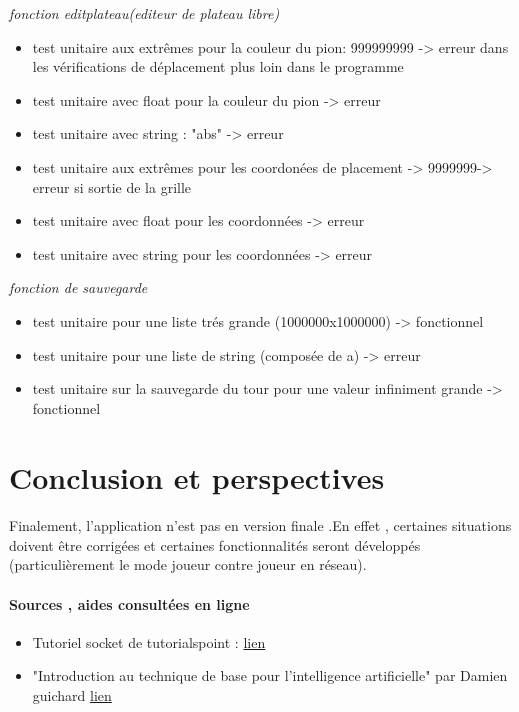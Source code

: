 \documentclass[a4paper,12pt]{article}
\begin{document}
\emph{fonction editplateau(editeur de plateau libre)}
\begin{itemize}
\item test unitaire aux extrêmes pour la couleur du pion: 999999999 -> erreur dans les vérifications de déplacement plus loin dans le programme
\item test unitaire avec float pour la couleur du pion -> erreur
\item test unitaire avec string  : "abs"  -> erreur
\item test unitaire aux extrêmes pour les coordonées de placement -> 9999999-> erreur si sortie de la grille
\item test unitaire avec float pour les coordonnées -> erreur
\item test unitaire avec string pour les coordonnées -> erreur
\newline
\end{itemize}


\emph{fonction de sauvegarde}
\begin{itemize}
\item test unitaire pour une liste trés grande (1000000x1000000) -> fonctionnel
\item test unitaire pour une liste de string (composée de a) -> erreur
\item test unitaire sur la sauvegarde du tour pour une valeur infiniment grande -> fonctionnel
\end{itemize}

\newpage

\section{Conclusion et perspectives}
\paragraph{}
Finalement, l'application n'est pas en version finale .En effet , certaines situations doivent être corrigées et certaines fonctionnalités seront développés (particulièrement le mode joueur contre joueur en réseau).
\newline
\paragraph{Sources , aides consultées en ligne}
\begin{itemize}
\item Tutoriel socket de tutorialspoint : \href {http://www.tutorialspoint.com/python/python_networking.htm}{lien}
\item "Introduction au technique de base pour l'intelligence artificielle" par Damien guichard  \href{http://damien-guichard.developpez.com/tutoriels/algo/introduction-techniques-IA/}{lien}
\end{itemize} 
\end{document}
